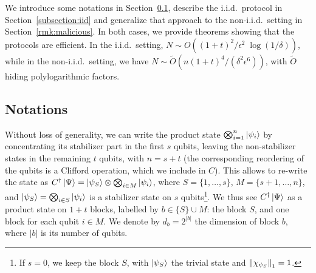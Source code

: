 \documentclass[a4paper,twocolumn,11pt,unpublished]{quantumarticle}
\begin{document}
We introduce some notations in Section\ \ref{subsection:notations}, describe the i.i.d.\ protocol in Section\ \ref{subsection:iid} and generalize that approach to the non-i.i.d.\ setting in Section\ \ref{rmk:malicious}. In both cases, we provide theorems showing that the protocols are efficient. In the i.i.d.\ setting, $N \sim O((1+t)^2/\epsilon^2 \; \log(1/\delta))$, while in the non-i.i.d.\ setting, we have $N\sim \tilde O(n(1+t)^4/(\delta^2\epsilon^6))$, with $\tilde O$ hiding polylogarithmic factors.


\subsection{Notations}
\label{subsection:notations}
Without loss of generality, we can write the product state $\bigotimes_{i=1}^n\ket{\psi_i}$ by concentrating its stabilizer part in the first $s$ qubits, leaving the non-stabilizer states in the remaining $t$ qubits, with $n=s+t$ (the corresponding reordering of the qubits is a Clifford operation, which we include in $C$).
            This allows to re-write the state as $C^\dagger\ket\Psi=\ket{\psi_S}\otimes\bigotimes_{i\in M}\ket{\psi_i}$, where $S=\{1,\dots,s\}$, $M=\{s+1,\dots,n\}$, and $\ket{\psi_S}=\bigotimes_{i\in S}\ket{\psi_i}$ is a stabilizer state on $s$ qubits\footnote{If $s=0$, we keep the block $S$, with $\ket{\psi_S}$ the trivial state and $\left\lVert\chi_{\psi_S}\right\rVert_1=1$.}. We thus see $C^\dagger\ket\Psi$ as a product state on $1+t$ blocks, labelled by $b\in\{S\}\cup M$: the block $S$, and one block for each qubit $i\in M$. We denote by $d_b=2^{|b|}$ the dimension of block $b$, where $|b|$ is its number of qubits.
\end{document}
